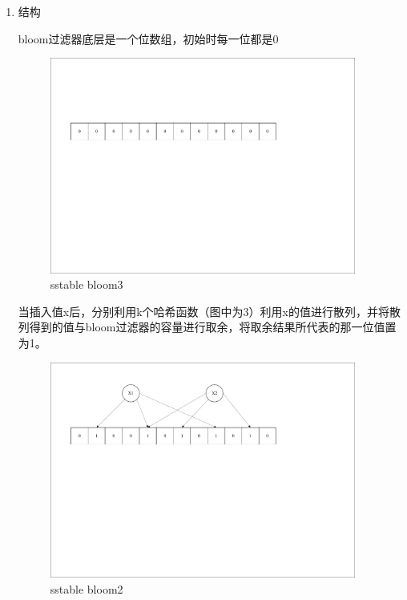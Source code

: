 		\begin{enumerate}
			\item 结构 
			
			bloom过滤器底层是一个位数组，初始时每一位都是0 

			\begin{figure}[H]
				\centering
				\includegraphics[width=0.95\textwidth]{pdf/bloom1.pdf}
				\caption{sstable bloom3}
				\label{sstable_bloom3}
			\end{figure}
			

当插入值x后，分别利用k个哈希函数（图中为3）利用x的值进行散列，并将散列得到的值与bloom过滤器的容量进行取余，将取余结果所代表的那一位值置为1。

\begin{figure}[H]
	\centering
	\includegraphics[width=0.95\textwidth]{pdf/bloom2.pdf}
	\caption{sstable bloom2}
	\label{sstable_bloom2}
\end{figure}


\end{enumerate}
